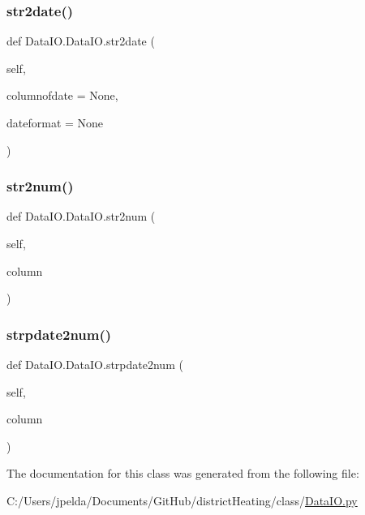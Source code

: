 \mbox{\label{class_data_i_o_1_1_data_i_o_a59071592ed63d8d505677035fd5ebda1}} 
\subsubsection{\texorpdfstring{str2date()}{str2date()}}
{\footnotesize\ttfamily def Data\+I\+O.\+Data\+I\+O.\+str2date (\begin{DoxyParamCaption}\item[{}]{self,  }\item[{}]{columnofdate = {\ttfamily None},  }\item[{}]{dateformat = {\ttfamily None} }\end{DoxyParamCaption})}

\mbox{\label{class_data_i_o_1_1_data_i_o_ae42c01ae3b0f343c292cb199327106f5}} 
\subsubsection{\texorpdfstring{str2num()}{str2num()}}
{\footnotesize\ttfamily def Data\+I\+O.\+Data\+I\+O.\+str2num (\begin{DoxyParamCaption}\item[{}]{self,  }\item[{}]{column }\end{DoxyParamCaption})}

\mbox{\label{class_data_i_o_1_1_data_i_o_a14e038023e1dd43e8c0a18842b4b73fb}} 
\subsubsection{\texorpdfstring{strpdate2num()}{strpdate2num()}}
{\footnotesize\ttfamily def Data\+I\+O.\+Data\+I\+O.\+strpdate2num (\begin{DoxyParamCaption}\item[{}]{self,  }\item[{}]{column }\end{DoxyParamCaption})}



The documentation for this class was generated from the following file\+:\begin{DoxyCompactItemize}
\item 
C\+:/\+Users/jpelda/\+Documents/\+Git\+Hub/district\+Heating/class/\hyperlink{_data_i_o_8py}{Data\+I\+O.\+py}\end{DoxyCompactItemize}
